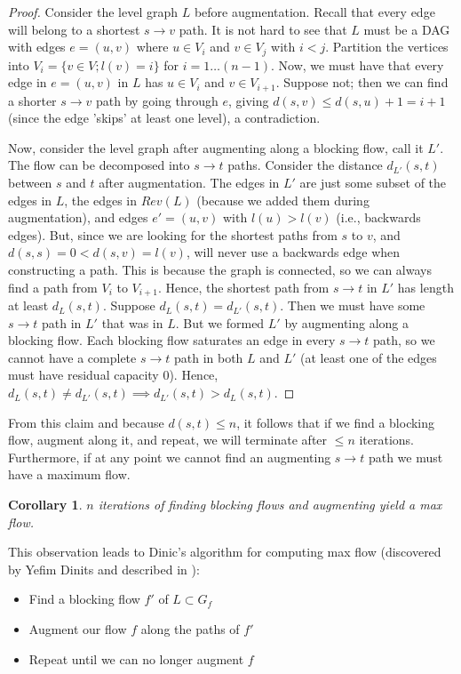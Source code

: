 \documentclass[11pt]{article}
\newtheorem{corollary}[theorem]{Corollary}
\begin{document}
\begin{proof}
Consider the level graph $L$ before augmentation. Recall that every edge will belong to a shortest $s \to v$ path. It is not hard to see that $L$ must be a DAG with edges $e = (u, v)$ where $u \in V_{i}$ and $v \in V_j$ with $i < j$. Partition the vertices into $V_i = \{v \in V; l(v) = i \}$ for $i = 1 \ldots (n - 1)$. Now, we must have that every edge in $e  = (u, v)$ in $L$ has $u \in V_i$ and $v \in V_{i + 1}$. Suppose not; then we can find a shorter $s \to v$ path by going through $e$, giving $d(s, v) \leq d(s, u) + 1 = i + 1$ (since the edge 'skips' at least one level), a contradiction. 

Now, consider the level graph after augmenting along a blocking flow, call it $L'$. The flow can be decomposed into $s \to t$ paths. Consider the distance $d_{L'}(s, t)$ between $s$ and $t$ after augmentation. The edges in $L'$ are just some subset of the edges in $L$, the edges in $Rev(L)$ (because we added them during augmentation), and edges $e' = (u, v)$ with $l(u) > l(v)$ (i.e., backwards edges). But, since we are looking for the shortest paths from $s$ to $v$, and $d(s, s) = 0 < d(s, v) = l(v)$, will never use a backwards edge when constructing a path. This is because the graph is connected, so we can always find a path from $V_i$ to $V_{i + 1}$.  Hence, the shortest path from $s \to t$ in $L'$ has length at least $d_L(s, t)$. Suppose $d_L(s, t) = d_{L'}(s, t)$. Then we must have some $s \to t$ path in $L'$ that was in $L$. But we formed $L'$ by augmenting along a blocking flow. Each blocking flow saturates an edge in every $s \to t$ path, so we cannot have a complete $s \to t$ path in both $L$ and $L'$ (at least one of the edges must have residual capacity 0). Hence, $d_L(s, t) \neq d_{L'}(s, t) \implies d_{L'}(s, t) > d_L(s, t) $. 
\end{proof}

From this claim and because $d(s, t) \leq n$, it follows that if we find a blocking flow, augment along it, and repeat, we will terminate after $\leq n$ iterations. Furthermore, if at any point we cannot find an augmenting $s \to t$ path we must have a maximum flow. 

\begin{corollary} \label{num_iters}
$n$ iterations of finding blocking flows and augmenting yield a max flow. 
\end{corollary}

This observation leads to Dinic's algorithm for computing max flow (discovered by Yefim Dinits and described in \cite{dinics}):
\begin{itemize}
\item Find a blocking flow $f'$ of $L \subset G_f$
\item Augment our flow $f$ along the paths of $f'$
\item Repeat until we can no longer augment $f$ 
\end{itemize}
\end{document}
